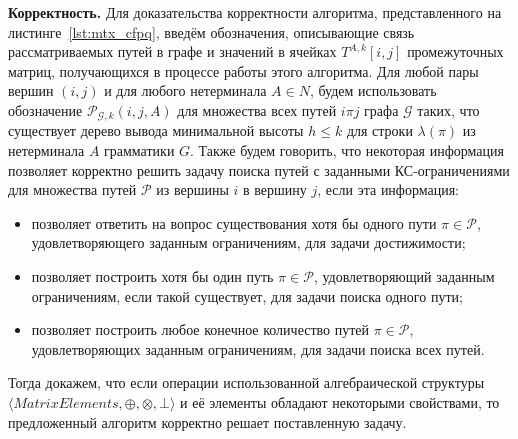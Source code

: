 \textbf{Корректность.} Для доказательства корректности алгоритма, представленного на листинге~\ref{lst:mtx_cfpq}, введём обозначения, описывающие связь рассматриваемых путей в графе и значений в ячейках $T^{A, k}[i, j]$ промежуточных матриц, получающихся в процессе работы этого алгоритма. Для любой пары вершин $(i, j)$ и для любого нетерминала $A \in N$, будем использовать обозначение $\mathcal{P}_{\mathcal{G}, k}(i, j, A)$ для множества всех путей $i \pi j$ графа $\mathcal{G}$ таких, что существует дерево вывода минимальной высоты $h \leq k$ для строки $\lambda(\pi)$ из нетерминала $A$ грамматики $G$. Также будем говорить, что некоторая информация позволяет корректно решить задачу поиска путей с заданными КС-ограничениями для множества путей $\mathcal{P}$ из вершины $i$ в вершину $j$, если эта информация:
\begin{itemize}
    \item позволяет ответить на вопрос существования хотя бы одного пути $\pi \in \mathcal{P}$, удовлетворяющего заданным ограничениям, для задачи достижимости;
    \item позволяет построить хотя бы один путь $\pi \in \mathcal{P}$, удовлетворяющий заданным ограничениям, если такой существует, для задачи поиска одного пути;
    \item позволяет построить любое конечное количество путей $\pi \in \mathcal{P}$, удовлетворяющих заданным ограничениям, для задачи поиска всех путей.
\end{itemize}

Тогда докажем, что если операции использованной алгебраической структуры $\langle \textit{MatrixElements}, \oplus, \otimes, \bot \rangle$ и её элементы обладают некоторыми свойствами, то предложенный алгоритм корректно решает поставленную задачу.

